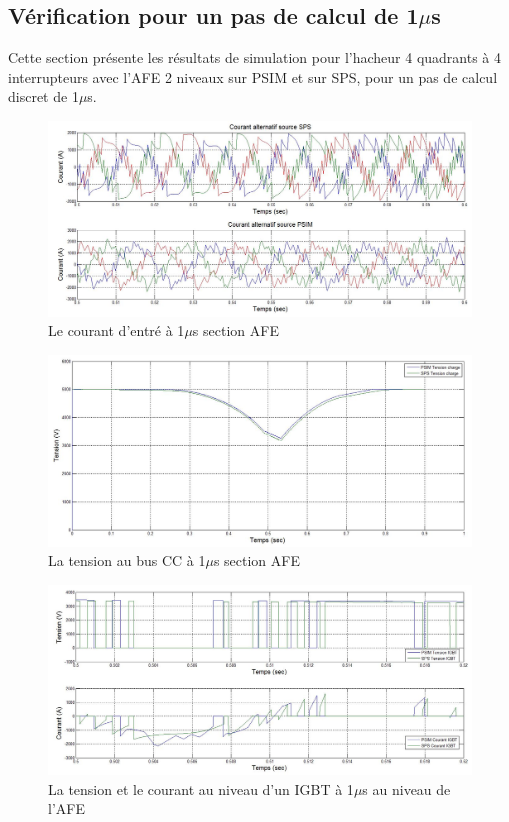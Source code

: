 \subsection{Vérification pour un pas de calcul de 1$\mu$s}
Cette section présente les résultats de simulation pour l'hacheur 4 quadrants à 4 interrupteurs avec l'AFE 2 niveaux sur PSIM et sur SPS, pour un pas de calcul discret de 1$\mu$s. 


\begin{figure}[htb]
\centering
\includegraphics[scale=0.5]{fig/Hach_AFE/1u/cour_al.jpg}
\caption{Le courant d'entré à 1$\mu$s section AFE}
\label{AF_HA_cou1}
\end{figure}


\begin{figure}[htb]
\centering
\includegraphics[scale=0.5]{fig/Hach_AFE/1u/ten_bus.jpg}
\caption{La tension au bus CC à 1$\mu$s section AFE}
\label{AF_HA_vch1}
\end{figure}



\begin{figure}[htb]
\centering
\includegraphics[scale=0.5]{fig/Hach_AFE/1u/IGBT_AFE.jpg}
\caption{La tension et le courant au niveau d'un IGBT à 1$\mu$s au niveau de l'AFE}
\label{AF_HA_IGBT1}
\end{figure}


